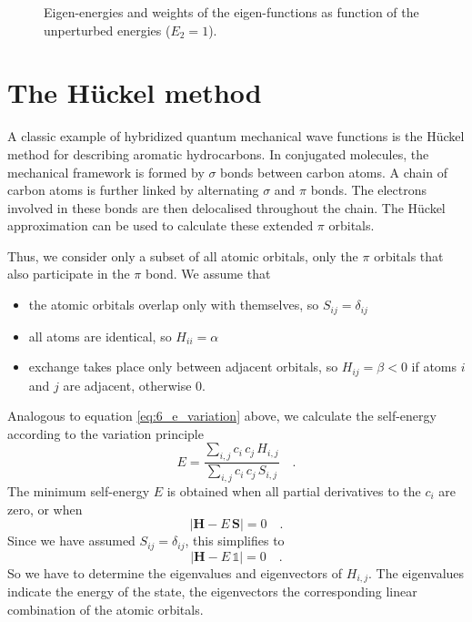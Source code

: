 \begin{figure}
\caption{Eigen-energies and weights of the eigen-functions as function of the unperturbed energies ($E_2 = 1$).}
\label{fig:6_anticrossing}
\end{figure}








\section{The Hückel method}

A classic example of hybridized quantum mechanical wave functions is the Hückel method for describing aromatic hydrocarbons.
 In conjugated molecules, the mechanical framework is formed by $\sigma$ bonds between carbon atoms. A chain of carbon atoms is further linked by alternating $\sigma$ and $\pi$ bonds. The electrons involved in these bonds are then delocalised throughout the chain. The Hückel approximation can be used to calculate these extended $\pi$ orbitals.

Thus, we consider only a subset of all atomic orbitals, only the $\pi$ orbitals that also participate in the $\pi$ bond. We assume that
\begin{itemize} \setlength{\itemsep}{0pt}
\item the atomic orbitals overlap only with themselves, so $S_{ij} = \delta_{ij}$
\item all atoms are identical, so $H_{ii} = \alpha$
\item exchange takes place only between adjacent orbitals, so $H_{ij} = \beta < 0 $ if atoms $i$ and $j$ are adjacent, otherwise $0$. 
\end{itemize}

Analogous to equation \ref{eq:6_e_variation} above, we calculate the self-energy according to the variation principle
\begin{equation}
 E = \frac{ \sum_{i,j} c_i \, c_j \, H_{i,j} }{ \sum_{i,j} c_i \, c_j \, S_{i,j} } \quad .
\end{equation}
The minimum self-energy $E$ is obtained when all partial derivatives to the $c_i$ are zero, or when
\begin{equation}
 \left| \mathbf{H} - E \, \mathbf{S}\right| = 0 \quad .
\end{equation}
Since we have assumed $S_{ij} = \delta_{ij}$, this simplifies to 
\begin{equation}
 \left| \mathbf{H} - E \, \mathds{1} \right| = 0 \quad .
\end{equation}
So we have to determine the eigenvalues and eigenvectors of $H_{i,j}$. The eigenvalues indicate the energy of the state, the eigenvectors the corresponding linear combination of the atomic orbitals.


